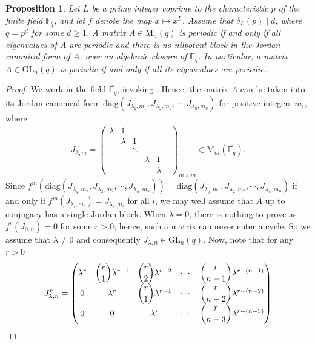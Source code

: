 \documentclass[10pt,a4paper]{amsart}
\newtheorem{proposition}{Proposition}
\newcommand{\F}{\mathbb{F}}
\newcommand{\GL}{\mathrm{GL}}
\newcommand{\M}{\mathrm{M}}
\newcommand{\diag}{\mathrm{diag}}
\begin{document}
\begin{proposition}\label{prop:candidacy}
Let $L$ be a prime integer coprime to the characteristic $p$ of the finite field $\F_q$, and let $f$ denote the map $x\mapsto x^L$. Assume that $\delta_L(p)\mid d$, where $q=p^d$ for some $d\ge 1$.
A matrix $A \in \M_n(q)$ is periodic if and only if all eigenvalues of $A$ are periodic and there is no nilpotent block in the Jordan canonical form of $A$, over an algebraic closure of $\F_q$.
In particular, a matrix $A\in \GL_n(q)$ is periodic if and only if all its eigenvalues are periodic.
\end{proposition}

\begin{proof}
    We work in the field $\overline{\F_q}$, invoking . 
    Hence, the matrix $A$ can be taken into its Jordan canonical form $\diag(J_{\lambda_q,m_1},J_{\lambda_2,m_2},\cdots, J_{\lambda_u,m_u})$ for positive integers $m_i$, where
    \begin{align*}
        J_{\lambda,m}=\begin{pmatrix}
            \lambda & 1 &&&&\\
            &\lambda&1&&&\\
            &&\ddots&&&\\
            &&&\lambda&1\\
            &&&&\lambda
        \end{pmatrix}_{m\times m}\in\M_m(\overline{\F_q}).
    \end{align*}
    Since $f^m(\diag(J_{\lambda_q,m_1},J_{\lambda_2,m_2},\cdots, J_{\lambda_u,m_u}))=\diag(J_{\lambda_q,m_1},J_{\lambda_2,m_2},\cdots, J_{\lambda_u,m_u})$ if and only if $f^m(J_{\lambda_i,m_i})=J_{\lambda_i,m_i}$ for all $i$, we may well assume that $A$ up to conjugacy has a single Jordan block.
    When $\lambda=0$, there is nothing to prove as $f^r(J_{0,n})=0$ for some $r>0$; hence, such a matrix can never enter a cycle. 
    So we assume that $\lambda\neq0$ and consequently $J_{\lambda,n}\in\GL_n(q)$.
    Now, note that for any $r>0$
    \begin{align*}
        J_{\lambda,n}^r=
\begin{pmatrix}
\lambda^r & \dbinom{r}{1}\lambda^{r-1} & \dbinom{r}{2}\lambda^{r-2} & \cdots & \dbinom{r}{n-1}\lambda^{r-(n-1)} \\
0 & \lambda^r & \dbinom{r}{1}\lambda^{r-1} & \cdots & \dbinom{r}{n-2}\lambda^{r-(n-2)} \\
0 & 0 & \lambda^r & \cdots & \dbinom{r}{n-3}\lambda^{r-(n-3)} \\

\end{pmatrix}
\end{align*}
\end{proof}
\end{document}
